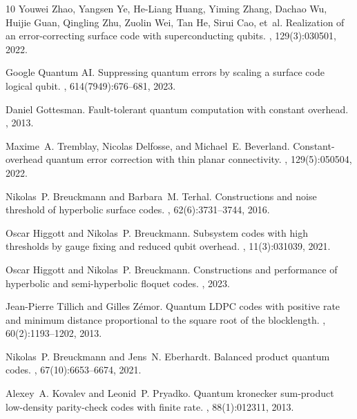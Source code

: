 \documentclass{article}
\begin{document}
\begin{thebibliography}{10}
	Youwei Zhao, Yangsen Ye, He-Liang Huang, Yiming Zhang, Dachao Wu, Huijie Guan,
	Qingling Zhu, Zuolin Wei, Tan He, Sirui Cao, et~al.
	\newblock Realization of an error-correcting surface code with superconducting
	qubits.
	, 129(3):030501, 2022.
	
	{Google Quantum AI}.
	\newblock Suppressing quantum errors by scaling a surface code logical qubit.
	, 614(7949):676--681, 2023.
	
	Daniel Gottesman.
	\newblock Fault-tolerant quantum computation with constant overhead.
	, 2013.
	
	Maxime~A. Tremblay, Nicolas Delfosse, and Michael~E. Beverland.
	\newblock Constant-overhead quantum error correction with thin planar
	connectivity.
	, 129(5):050504, 2022.
	
	Nikolas~P. Breuckmann and Barbara~M. Terhal.
	\newblock Constructions and noise threshold of hyperbolic surface codes.
	, 62(6):3731--3744,
	2016.
	
	Oscar Higgott and Nikolas~P. Breuckmann.
	\newblock Subsystem codes with high thresholds by gauge fixing and reduced
	qubit overhead.
	, 11(3):031039, 2021.
	
	Oscar Higgott and Nikolas~P. Breuckmann.
	\newblock Constructions and performance of hyperbolic and semi-hyperbolic
	floquet codes.
	, 2023.
	
	Jean-Pierre Tillich and Gilles Z{\'e}mor.
	\newblock Quantum {LDPC} codes with positive rate and minimum distance
	proportional to the square root of the blocklength.
	, 60(2):1193--1202,
	2013.
	
	Nikolas~P. Breuckmann and Jens~N. Eberhardt.
	\newblock Balanced product quantum codes.
	, 67(10):6653--6674,
	2021.
	
	Alexey~A. Kovalev and Leonid~P. Pryadko.
	\newblock Quantum kronecker sum-product low-density parity-check codes with
	finite rate.
	, 88(1):012311, 2013.
	

\end{thebibliography}
\end{document}
